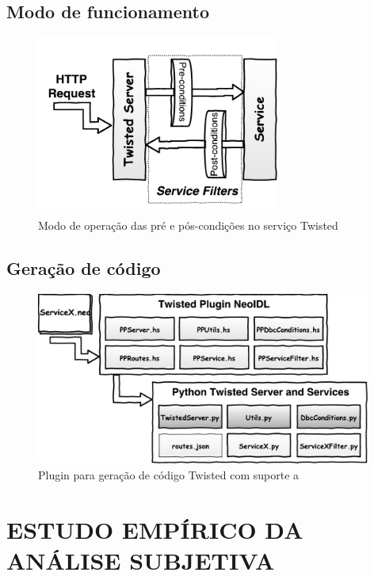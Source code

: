 \subsection{Modo de funcionamento}

\begin{figure}[!htb]
\centering
\includegraphics[width=80mm,trim = 5mm 6mm 0mm 
3mm,clip]{img/TwistedFilters.pdf}
\caption{Modo de operação das pré e pós-condições no serviço Twisted}
\label{Fig:TwistedFiltes}
\end{figure}


\subsection{Geração de código}

\begin{figure}[!htb]
\centering
\includegraphics[width=110mm,trim = 0mm 0mm 0mm 
0mm,clip]{img/PluginTwisted.pdf}
\caption{Plugin para geração de código Twisted com suporte a \designbycontract{}}
\label{PluginTwisted}
\end{figure}


\section{ESTUDO EMPÍRICO DA ANÁLISE SUBJETIVA} 
\vspace{-6mm}

